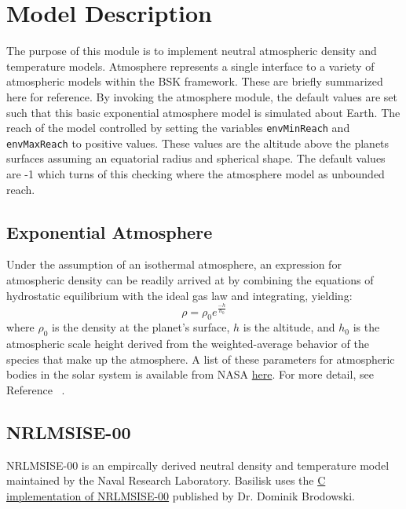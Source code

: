 
\section{Model Description}

The purpose of this module is to implement neutral atmospheric density and temperature models.
Atmosphere represents a single interface to a variety of atmospheric models within the BSK framework. These are briefly summarized here for reference.
By invoking the atmosphere module, the default values are set such that this basic exponential atmosphere model is simulated about Earth.
The reach of the model controlled by setting the variables {\tt envMinReach} and {\tt envMaxReach} to positive values.  These values are the altitude above the planets surfaces assuming an equatorial radius and spherical shape.  The default values are -1 which turns of this checking where the atmosphere model as unbounded reach.  

\subsection{Exponential Atmosphere}
Under the assumption of an isothermal atmosphere, an expression for atmospheric density can be readily arrived at by combining the equations of hydrostatic equilibrium with the ideal gas law and integrating, yielding:
\begin{equation}
\label{eq:expAtmo}
\rho = \rho_0 e^{\frac{-h}{h_0}}
\end{equation}
where $\rho_0$ is the density at the planet's surface, $h$ is the altitude, and $h_0$ is the atmospheric scale height derived from the weighted-average behavior of the species that make up the atmosphere. A list of these parameters
for atmospheric bodies in the solar system is available from NASA \href{https://nssdc.gsfc.nasa.gov/planetary/planetfact.html}{here}. For more detail, see Reference ~. 


\subsection{NRLMSISE-00}
NRLMSISE-00 is an empircally derived neutral density and temperature model maintained by the Naval Research Laboratory. Basilisk uses the \href{https://www.brodo.de/space/nrlmsise/index.html}{C implementation of NRLMSISE-00} published by Dr. Dominik Brodowski.